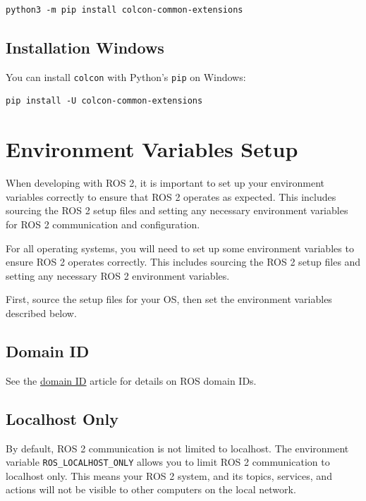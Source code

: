 \begin{verbatim}
python3 -m pip install colcon-common-extensions
\end{verbatim}

\subsection{Installation Windows}

You can install \texttt{colcon} with Python's \texttt{pip} on Windows:

\begin{verbatim}
pip install -U colcon-common-extensions
\end{verbatim}

\section{Environment Variables Setup}
\label{sec:env-vars-setup}

When developing with ROS 2, it is important to set up your environment variables correctly to ensure that ROS 2 operates as expected. This includes sourcing the ROS 2 setup files and setting any necessary environment variables for ROS 2 communication and configuration.

For all operating systems, you will need to set up some environment variables to ensure ROS 2 operates correctly. This includes sourcing the ROS 2 setup files and setting any necessary ROS 2 environment variables.

First, source the setup files for your OS, then set the environment variables described below.

\subsection{Domain ID}

See the \href{https://docs.ros.org/en/humble/Concepts/Intermediate/About-Domain-ID.html}{domain ID} article for details on ROS domain IDs.

\subsection{Localhost Only}

By default, ROS 2 communication is not limited to localhost. The environment variable \texttt{ROS\_LOCALHOST\_ONLY} allows you to limit ROS 2 communication to localhost only. This means your ROS 2 system, and its topics, services, and actions will not be visible to other computers on the local network.

